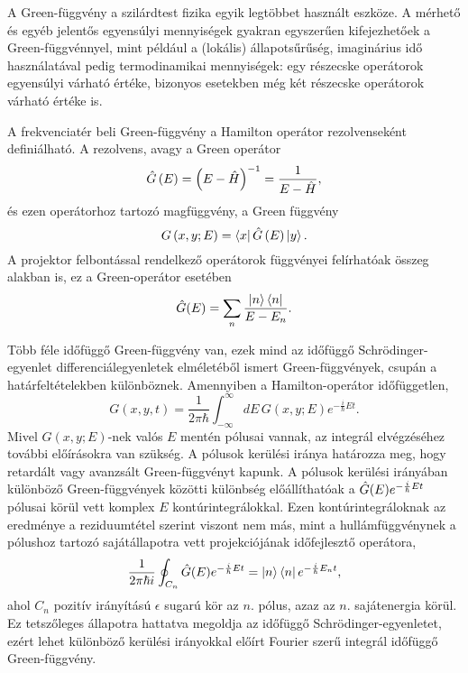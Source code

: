 A Green-függvény a szilárdtest fizika egyik legtöbbet használt eszköze. A mérhető és egyéb jelentős egyensúlyi mennyiségek gyakran egyszerűen kifejezhetőek a Green-függvénnyel, mint például a (lokális) állapotsűrűség, imaginárius idő használatával pedig termodinamikai mennyiségek: egy részecske operátorok egyensúlyi várható értéke, bizonyos esetekben még két részecske operátorok várható értéke is.

A frekvenciatér beli Green-függvény a Hamilton operátor rezolvenseként definiálható. A rezolvens, avagy a Green operátor
\begin{equation}
    \hat{G}\left( E \right) = \left(E-\hat{H}\right)^{-1} = \frac{1}{E-\hat{H}},
\end{equation}
és ezen operátorhoz tartozó magfüggvény, a Green függvény
\begin{equation}
    G\left( x, y; E \right) = \Bra{x}\hat{G}\left(E\right)\Ket{y}.
\end{equation}
A projektor felbontással rendelkező operátorok függvényei felírhatóak összeg alakban is, ez a Green-operátor esetében
\begin{equation}
	\hat{G}(E)=\sum_n \frac{\Ket{n}\Bra{n}}{E-E_n}.
	\label{green:greensum}
\end{equation}

Több féle időfüggő Green-függvény van, ezek mind az időfüggő Schrödinger-egyenlet differenciálegyenletek elméletéből ismert Green-függvények, csupán a határfeltételekben különböznek. Amennyiben a Hamilton-operátor időfüggetlen,
\begin{equation}
	G(x, y, t) = \frac{1}{2\pi\hbar}\int_{-\infty}^{\infty}dE\,G(x,y;E)e^{-\frac{i}{\hbar}Et}.
\end{equation}
Mivel $G(x,y;E)$-nek valós $E$ mentén pólusai vannak, az integrál elvégzéséhez további előírásokra van szükség. A pólusok kerülési iránya határozza meg, hogy retardált vagy avanzsált Green-függvényt kapunk. A pólusok kerülési irányában különböző Green-függvények közötti különbség előállíthatóak a $\hat{G}(E)e^{-\frac{i}{\hbar}Et}$ pólusai körül vett komplex $E$ kontúrintegrálokkal. Ezen kontúrintegráloknak az eredménye a reziduumtétel szerint viszont nem más, mint a hullámfüggvénynek a pólushoz tartozó sajátállapotra vett projekciójának időfejlesztő operátora,
\begin{equation}
	\frac{1}{2\pi\hbar i}\oint_{C_n}\hat{G}(E)e^{-\frac{i}{\hbar}Et}=\Ket{n}\Bra{n}e^{-\frac{i}{\hbar}E_nt},
	\label{green:residuum}
\end{equation}
ahol $C_n$ pozitív irányítású $\epsilon$ sugarú kör az $n$. pólus, azaz az $n$. sajátenergia körül. Ez tetszőleges állapotra hattatva megoldja az időfüggő Schrödinger-egyenletet, ezért lehet különböző kerülési irányokkal előírt Fourier szerű integrál időfüggő Green-függvény.

